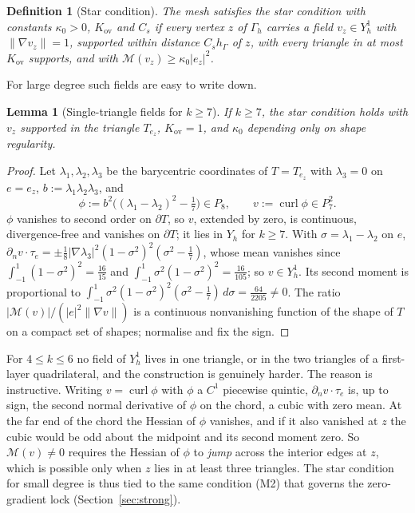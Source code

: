 \documentclass[pdflatex,sn-mathphys-num]{sn-jnl}
\theoremstyle{thmstyleone}
\newtheorem{lemma}[theorem]{Lemma}
\theoremstyle{thmstylethree}
\newtheorem{definition}[theorem]{Definition}
\newcommand{\hG}{h_\Gamma}
\newcommand{\Gh}{\Gamma_h}
\newcommand{\Yh}{Y_h}
\newcommand{\dn}{\partial_n}
\newcommand{\norm}[1]{\lVert #1\rVert}
\newcommand{\curl}{\operatorname{curl}}
\begin{document}
\begin{definition}[Star condition]\label{def:star}
The mesh satisfies the \emph{star condition} with constants $\kappa_0>0$, $K_{\mathrm{ov}}$ and $C_s$ if every vertex $z$ of $\Gh$ carries a field $v_z\in\Yh^1$ with $\norm{\nabla v_z}=1$, supported within distance $C_s\hG$ of $z$, with every triangle in at most $K_{\mathrm{ov}}$ supports, and with $\mathcal M(v_z)\ge\kappa_0|e_z|^2$.
\end{definition}

For large degree such fields are easy to write down.

\begin{lemma}[Single-triangle fields for $k\ge7$]\label{lem:k7}
If $k\ge7$, the star condition holds with $v_z$ supported in the triangle $T_{e_z}$, $K_{\mathrm{ov}}=1$, and $\kappa_0$ depending only on shape regularity.
\end{lemma}

\begin{proof}
Let $\lambda_1,\lambda_2,\lambda_3$ be the barycentric coordinates of $T=T_{e_z}$ with $\lambda_3=0$ on $e=e_z$, $b:=\lambda_1\lambda_2\lambda_3$, and
\[
\phi:=b^2\bigl((\lambda_1-\lambda_2)^2-\tfrac17\bigr)\in P_8,\qquad v:=\curl\phi\in P_7^2 .
\]
$\phi$ vanishes to second order on $\partial T$, so $v$, extended by zero, is continuous, divergence-free and vanishes on $\partial T$; it lies in $\Yh$ for $k\ge7$. With $\sigma=\lambda_1-\lambda_2$ on $e$, $\dn v\cdot\tau_e=\pm\frac18|\nabla\lambda_3|^2(1-\sigma^2)^2(\sigma^2-\frac17)$, whose mean vanishes since $\int_{-1}^1(1-\sigma^2)^2=\frac{16}{15}$ and $\int_{-1}^1\sigma^2(1-\sigma^2)^2=\frac{16}{105}$; so $v\in\Yh^1$. Its second moment is proportional to $\int_{-1}^1\sigma^2(1-\sigma^2)^2(\sigma^2-\frac17)\,d\sigma=\frac{64}{2205}\ne0$. The ratio $|\mathcal M(v)|/(|e|^2\norm{\nabla v})$ is a continuous nonvanishing function of the shape of $T$ on a compact set of shapes; normalise and fix the sign.
\end{proof}

For $4\le k\le6$ no field of $\Yh^1$ lives in one triangle, or in the two triangles of a first-layer quadrilateral, and the construction is genuinely harder. The reason is instructive. Writing $v=\curl\phi$ with $\phi$ a $C^1$ piecewise quintic, $\dn v\cdot\tau_e$ is, up to sign, the second normal derivative of $\phi$ on the chord, a cubic with zero mean. At the far end of the chord the Hessian of $\phi$ vanishes, and if it also vanished at $z$ the cubic would be odd about the midpoint and its second moment zero. So $\mathcal M(v)\ne0$ requires the Hessian of $\phi$ to \emph{jump} across the interior edges at $z$, which is possible only when $z$ lies in at least three triangles. The star condition for small degree is thus tied to the same condition (M2) that governs the zero-gradient lock (Section~\ref{sec:strong}).
\end{document}
